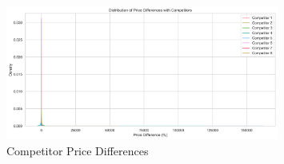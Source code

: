 \documentclass{article}
\begin{document}
\begin{figure}[H]
\centering
\includegraphics[width=0.8\textwidth]{../plots/competitor_price_diffs.png}
\caption{Competitor Price Differences}
\end{figure}
\end{document}
